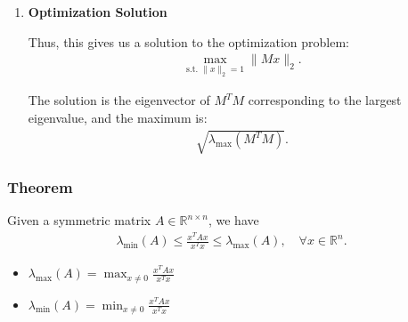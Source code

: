 \begin{derivation}
\begin{enumerate}
        \item \textbf{Optimization Solution}
        
        Thus, this gives us a solution to the optimization problem:
        \begin{align*}
            \max_{\text{s.t. }\|x\|_2 = 1} \|Mx\|_2.
        \end{align*}
        
        The solution is the eigenvector of $M^T M$ corresponding to the largest eigenvalue, and the maximum is:
        \begin{align*}
            \sqrt{\lambda_{\max}(M^T M)}.
        \end{align*}
    \end{enumerate}
\end{derivation}

\subsubsection{Theorem}
\begin{theorem}
    Given a symmetric matrix $A \in \mathbb{R}^{n \times n}$, we have 
    \begin{align*}
        \lambda_{\text{min}}(A) \leq \frac{x^T A x}{x^T x} \leq \lambda_{\text{max}}(A), \quad \forall x \in \mathbb{R}^n.
    \end{align*}
    \begin{itemize}
        \item $\lambda_{\text{max}}(A) = \max_{x \neq 0} \frac{x^T A x}{x^T x}$
        \item $\lambda_{\text{min}}(A) = \min_{x \neq 0} \frac{x^T A x}{x^T x}$
    \end{itemize}    
\end{theorem}

